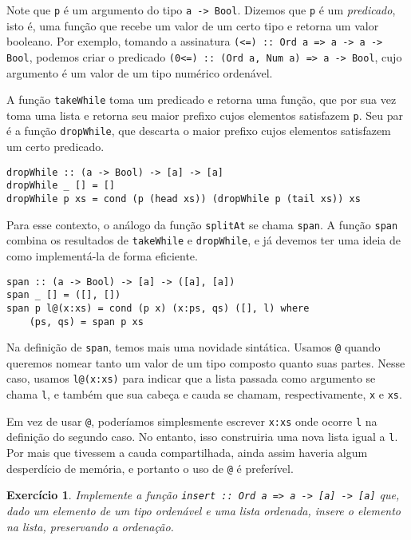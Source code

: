 \documentclass[a4paper]{article}
\newtheorem{exercicio}{Exercício}
\begin{document}
Note que \texttt{p} é um argumento do tipo \texttt{a -> Bool}.
Dizemos que \texttt{p} é um \emph{predicado}, isto é, uma função que recebe um valor de um certo tipo e retorna um valor booleano.
Por exemplo, tomando a assinatura \mbox{\texttt{(<=) :: Ord a => a -> a -> Bool}}, podemos criar o predicado \texttt{(0<=) :: (Ord a, Num a) => a -> Bool}, cujo argumento é um valor de um tipo numérico ordenável.

A função \texttt{takeWhile} toma um predicado e retorna uma função, que por sua vez toma uma lista e retorna seu maior prefixo cujos elementos satisfazem \texttt{p}.
Seu par é a função \texttt{dropWhile}, que descarta o maior prefixo cujos elementos satisfazem um certo predicado.

\begin{verbatim}
dropWhile :: (a -> Bool) -> [a] -> [a]
dropWhile _ [] = []
dropWhile p xs = cond (p (head xs)) (dropWhile p (tail xs)) xs
\end{verbatim}

Para esse contexto, o análogo da função \texttt{splitAt} se chama \texttt{span}.
A função \texttt{span} combina os resultados de \texttt{takeWhile} e \texttt{dropWhile}, e já devemos ter uma ideia de como implementá-la de forma eficiente.

\begin{verbatim}
span :: (a -> Bool) -> [a] -> ([a], [a])
span _ [] = ([], [])
span p l@(x:xs) = cond (p x) (x:ps, qs) ([], l) where
	(ps, qs) = span p xs
\end{verbatim}

Na definição de \texttt{span}, temos mais uma novidade sintática.
Usamos \texttt{@} quando queremos nomear tanto um valor de um tipo composto quanto suas partes.
Nesse caso, usamos \texttt{l@(x:xs)} para indicar que a lista passada como argumento se chama \texttt{l}, e também que sua cabeça e cauda se chamam, respectivamente, \texttt{x} e \texttt{xs}.

Em vez de usar \texttt{@}, poderíamos simplesmente escrever \texttt{x:xs} onde ocorre \texttt{l} na definição do segundo caso.
No entanto, isso construiria uma nova lista igual a \texttt{l}.
Por mais que tivessem a cauda compartilhada, ainda assim haveria algum desperdício de memória, e portanto o uso de \texttt{@} é preferível.

\begin{exercicio}
	Implemente a função \emph{\texttt{insert :: Ord a => a -> [a] -> [a]}} que, dado um elemento de um tipo ordenável e uma lista ordenada, insere o elemento na lista, preservando a ordenação.
\end{exercicio}
\end{document}
